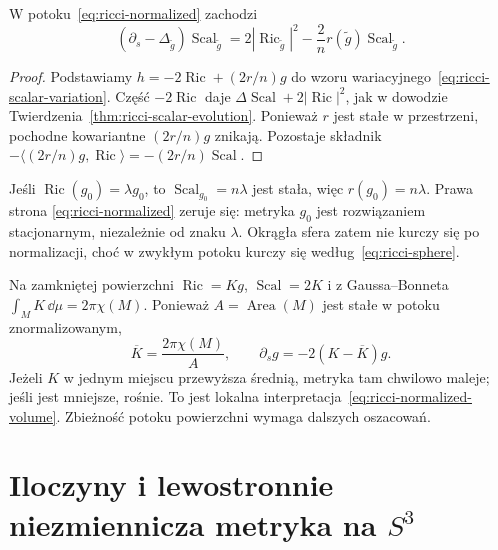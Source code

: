 \begin{stwierdzenie}
\label{prop:ricci-normalized-scalar}
W potoku~\eqref{eq:ricci-normalized} zachodzi
\begin{equation}\label{eq:ricci-normalized-scalar}
 (\partial_s-\Delta_{\widetilde g})
       \operatorname{Scal}_{\widetilde g}
 =2|\operatorname{Ric}_{\widetilde g}|^2
   -\frac{2}{n}r(\widetilde g)
                   \operatorname{Scal}_{\widetilde g}.
\end{equation}
\end{stwierdzenie}
\begin{proof}
Podstawiamy $h=-2\operatorname{Ric}+(2r/n)g$
do wzoru wariacyjnego~\eqref{eq:ricci-scalar-variation}.
Część $-2\operatorname{Ric}$ daje
$\Delta\operatorname{Scal}+2|\operatorname{Ric}|^2$,
jak w dowodzie Twierdzenia~\ref{thm:ricci-scalar-evolution}.
Ponieważ $r$ jest stałe w przestrzeni, pochodne kowariantne
$(2r/n)g$ znikają. Pozostaje składnik
$-\langle(2r/n)g,\operatorname{Ric}\rangle
=-(2r/n)\operatorname{Scal}$.
\end{proof}

\begin{przyklad}
\label{prz:ricci-normalized-einstein}
Jeśli $\operatorname{Ric}(g_0)=\lambda g_0$, to
$\operatorname{Scal}_{g_0}=n\lambda$ jest stała, więc
$r(g_0)=n\lambda$. Prawa strona
\eqref{eq:ricci-normalized} zeruje się: metryka $g_0$
jest rozwiązaniem stacjonarnym, niezależnie od znaku
$\lambda$. Okrągła sfera zatem nie kurczy się po
normalizacji, choć w zwykłym potoku kurczy się
według~\eqref{eq:ricci-sphere}.

Na zamkniętej powierzchni $\operatorname{Ric}=Kg$,
$\operatorname{Scal}=2K$ i z Gaussa--Bonneta
$\int_M K\,\dd\mu=2\pi\chi(M)$. Ponieważ
$A=\operatorname{Area}(M)$ jest stałe w potoku
znormalizowanym,
\[
 \overline K=\frac{2\pi\chi(M)}{A},\qquad
 \partial_sg=-2(K-\overline K)g.
\]
Jeżeli $K$ w jednym miejscu przewyższa średnią, metryka
tam chwilowo maleje; jeśli jest mniejsze, rośnie.
To jest lokalna interpretacja~\eqref{eq:ricci-normalized-volume}.
Zbieżność potoku powierzchni wymaga dalszych oszacowań.
\end{przyklad}

\section{Iloczyny i lewostronnie niezmiennicza metryka na $S^3$}
\label{sec:ricci-products-homogeneous}

